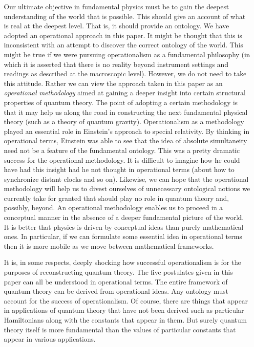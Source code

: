 \documentclass[10pt]{article}
\begin{document}
Our ultimate objective in fundamental physics must be to gain the deepest understanding of the world that is possible.   This should give an account of what is real at the deepest level. That is, it should provide an ontology.   We have adopted an operational approach in this paper.  It might be thought that this is inconsistent with an attempt to discover the correct ontology of the world.  This might be true if we were pursuing operationalism as a fundamental philosophy (in which it is asserted that there is no reality beyond instrument settings and readings as described at the macroscopic level).  However, we do not need to take this attitude.  Rather we can view the approach taken in this paper as an \emph{operational methodology} aimed at gaining a deeper insight into certain structural properties of quantum theory.  The point of adopting a certain methodology is that it may  help us along the road in constructing the next fundamental physical theory (such as a theory of quantum gravity).   Operationalism as a methodology played an essential role in Einstein's approach to special relativity.  By thinking in operational terms, Einstein was able to see that the idea of absolute simultaneity need not be a feature of the fundamental ontology.  This was a pretty dramatic success for the operational methodology.  It is difficult to imagine how he could have had this insight had he not thought in operational terms (about how to synchronize distant clocks and so on).  Likewise, we can hope that the operational methodology will help us to divest ourselves of unnecessary ontological notions we currently take for granted that should play no role in quantum theory and, possibly, beyond.  An operational methodology enables us to proceed in a conceptual manner in the absence of a deeper fundamental picture of the world.  It is better that physics is driven by conceptual ideas than purely mathematical ones.  In particular, if we can formulate some essential idea in operational terms then it is more mobile as we move between mathematical frameworks.

It is, in some respects, deeply shocking how successful operationalism is for the purposes of reconstructing quantum theory.  The five postulates given in this paper can all be understood in operational terms.  The entire framework of quantum theory can be derived from operational ideas. Any ontology must account for the success of operationalism.  Of course, there are things that appear in applications of quantum theory that have not been derived such as particular Hamiltonians along with the constants that appear in them.  But surely quantum theory itself is more fundamental than the values of particular constants that appear in various applications.
\end{document}
